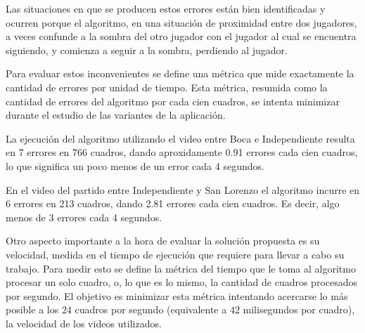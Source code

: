 Las situaciones en que se producen estos errores están bien identificadas
y ocurren porque el algoritmo, en una situación de proximidad entre dos
jugadores, a veces confunde a la sombra del otro jugador con el jugador
al cual se encuentra siguiendo, y comienza a seguir a la sombra, perdiendo
al jugador.


Para evaluar estos inconvenientes se define una métrica que mide exactamente la
cantidad de errores por unidad de tiempo. Esta métrica, resumida como la
cantidad de errores del algoritmo por cada cien cuadros, se intenta minimizar
durante el estudio de las variantes de la aplicación.

La ejecución del algoritmo utilizando el video entre Boca e Independiente
resulta en 7 errores en 766 cuadros, dando aproxidamente 0.91 errores cada cien
cuadros, lo que significa un poco menos de un error cada 4 segundos.

En el video del partido entre Independiente y San Lorenzo el algoritmo incurre
en 6 errores en 213 cuadros, dando 2.81 errores cada cien cuadros. Es decir,
algo menos de 3 errores cada 4 segundos.

Otro aspecto importante a la hora de evaluar la solución propuesta es su
velocidad, medida en el tiempo de ejecución que requiere para llevar a cabo su
trabajo. Para medir esto se define la métrica del tiempo que le toma al
algoritmo procesar un solo cuadro, o, lo que es lo mismo, la cantidad de
cuadros procesados por segundo. El objetivo es minimizar esta métrica
intentando acercarse lo más posible a los $24$ cuadros por segundo (equivalente
a $42$ milisegundos por cuadro), la velocidad de los videos utilizados.



